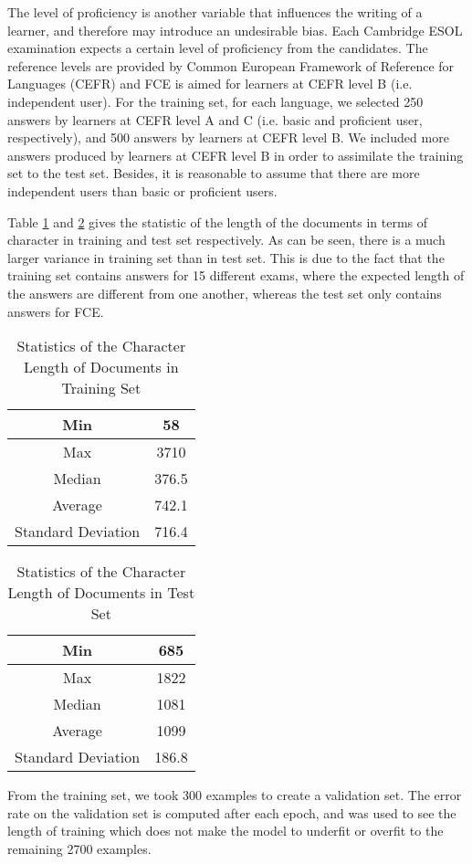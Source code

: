 The level of proficiency is another variable that influences the writing of a learner, and therefore may introduce an undesirable bias.
Each Cambridge ESOL examination expects a certain level of proficiency from the candidates.
The reference levels are provided by Common European Framework of Reference for Languages (CEFR) \citep{council2001common} and FCE is aimed for learners at CEFR level B (i.e. independent user).
For the training set, for each language, we selected 250 answers by learners at CEFR level A and C (i.e. basic and proficient user, respectively), and 500 answers by learners at CEFR level B.
We included more answers produced by learners at CEFR level B in order to assimilate the training set to the test set.
Besides, it is reasonable to assume that there are more independent users than basic or proficient users.

Table \ref{tab:tr-stat} and \ref{tab:te-stat} gives the statistic of the length of the documents in terms of character in training and test set respectively.
As can be seen, there is a much larger variance in training set than in test set.
This is due to the fact that the training set contains answers for 15 different exams, where the expected length of the answers are different from one another, whereas the test set only contains answers for FCE.
\begin{table}[]
\centering
\caption{Statistics of the Character Length of Documents in Training Set}
\label{tab:tr-stat}
\begin{tabular}{|c|c|}
\hline
Min         & 58 \\ \hline
Max      & 3710     \\ \hline
Median    & 376.5    \\ \hline
Average & 742.1   \\ \hline
Standard Deviation    & 716.4   \\ \hline
\end{tabular}
\end{table}
\begin{table}[]
\centering
\caption{Statistics of the Character Length of Documents in Test Set}
\label{tab:te-stat}
\begin{tabular}{|c|c|}
\hline
Min         & 685\\ \hline
Max      & 1822     \\ \hline
Median    & 1081   \\ \hline
Average & 1099    \\ \hline
Standard Deviation    & 186.8    \\ \hline
\end{tabular}
\end{table}

From the training set, we took 300 examples to create a validation set.
The error rate on the validation set is computed after each epoch, and was used to see the length of training which does not make the model to underfit or overfit to the remaining 2700 examples.
